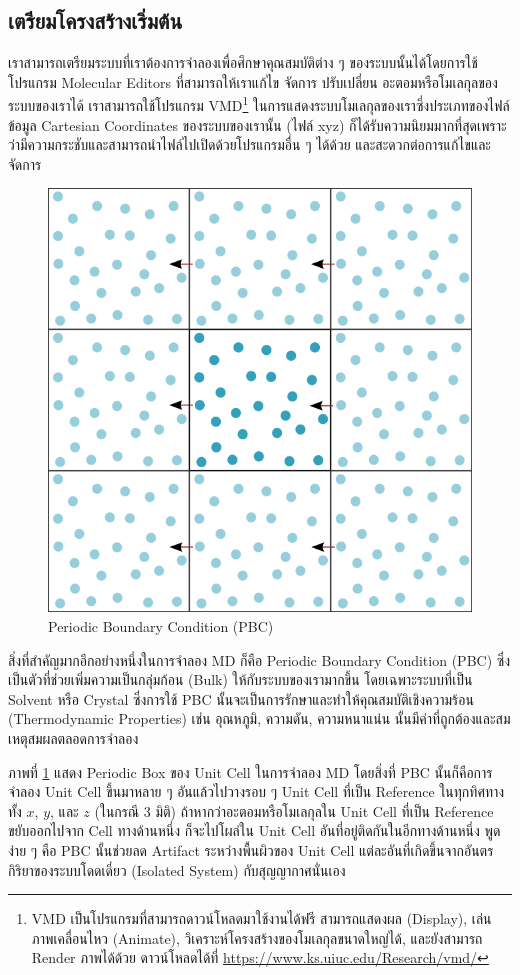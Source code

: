 \subsection{เตรียมโครงสร้างเริ่มต้น}

เราสามารถเตรียมระบบที่เราต้องการจำลองเพื่อศึกษาคุณสมบัติต่าง ๆ ของระบบนั้นได้โดยการใช้โปรแกรม Molecular Editors ที่สามารถให้เราแก้ไข จัดการ ปรับเปลี่ยน อะตอมหรือโมเลกุลของระบบของเราได้ เราสามารถใช้โปรแกรม VMD\footnote{VMD เป็นโปรแกรมที่สามารถดาวน์โหลดมาใช้งานได้ฟรี สามารถแสดงผล (Display), เล่นภาพเคลื่อนไหว (Animate), วิเคราะห์โครงสร้างของโมเลกุลขนาดใหญ่ได้, และยังสามารถ Render ภาพได้ด้วย ดาวน์โหลดได้ที่ \url{https://www.ks.uiuc.edu/Research/vmd/}} ในการแสดงระบบโมเลกุลของเราซึ่งประเภทของไฟล์ข้อมูล Cartesian Coordinates ของระบบของเรานั้น (ไฟล์ xyz) ก็ได้รับความนิยมมากที่สุดเพราะว่ามีความกระชับและสามารถนำไฟล์ไปเปิดด้วยโปรแกรมอื่น ๆ ได้ด้วย และสะดวกต่อการแก้ไขและจัดการ

\begin{figure}[H]
  \centering
  \includegraphics[width=0.4\linewidth]{fig/pbc.png}
  \caption{Periodic Boundary Condition (PBC)}
  \label{fig:pbc}
\end{figure}

สิ่งที่สำคัญมากอีกอย่างหนึ่งในการจำลอง MD ก็คือ Periodic Boundary Condition (PBC) ซึ่งเป็นตัวที่ช่วยเพิ่มความเป็นกลุ่มก้อน (Bulk) ให้กับระบบของเรามากขึ้น โดยเฉพาะระบบที่เป็น Solvent หรือ Crystal ซึ่งการใช้ PBC นั้นจะเป็นการรักษาและทำให้คุณสมบัติเชิงความร้อน (Thermodynamic Properties) เช่น อุณหภูมิ, ความดัน, ความหนาแน่น นั้นมีค่าที่ถูกต้องและสมเหตุสมผลตลอดการจำลอง

ภาพที่ \ref{fig:pbc} แสดง Periodic Box ของ Unit Cell ในการจำลอง MD โดยสิ่งที่ PBC นั้นก็คือการจำลอง Unit Cell ขึ้นมาหลาย ๆ อันแล้วไปวางรอบ ๆ Unit Cell ที่เป็น Reference ในทุกทิศทางทั้ง $x$, $y$, และ $z$ (ในกรณี 3 มิติ) ถ้าหากว่าอะตอมหรือโมเลกุลใน Unit Cell ที่เป็น Reference ขยับออกไปจาก Cell ทางด้านหนึ่ง ก็จะไปโผล่ใน Unit Cell อันที่อยู่ติดกันในอีกทางด้านหนึ่ง พูดง่าย ๆ คือ PBC นั้นช่วยลด Artifact ระหว่างพื้นผิวของ Unit Cell แต่ละอันที่เกิดขึ้นจากอันตรกิริยาของระบบโดดเดี่ยว (Isolated System) กับสุญญากาศนั่นเอง

